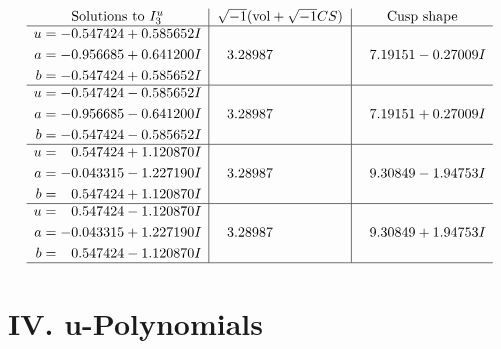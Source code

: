 \documentclass[1p]{elsarticle_modified}
\theoremstyle{definition}
\newcommand{\I}{\sqrt{-1}}
\begin{document}
$$\begin{array}{c|c|c}  
\text{Solutions to }I^u_{3}& \I (\text{vol} + \sqrt{-1}CS) & \text{Cusp shape}\\
 \hline 
\begin{aligned}
u &= -0.547424 + 0.585652 I \\
a &= -0.956685 + 0.641200 I \\
b &= -0.547424 + 0.585652 I\end{aligned}
 & \phantom{-}3.28987\phantom{ +0.000000I} & \phantom{-}7.19151 - 0.27009 I \\ \hline\begin{aligned}
u &= -0.547424 - 0.585652 I \\
a &= -0.956685 - 0.641200 I \\
b &= -0.547424 - 0.585652 I\end{aligned}
 & \phantom{-}3.28987\phantom{ +0.000000I} & \phantom{-}7.19151 + 0.27009 I \\ \hline\begin{aligned}
u &= \phantom{-}0.547424 + 1.120870 I \\
a &= -0.043315 - 1.227190 I \\
b &= \phantom{-}0.547424 + 1.120870 I\end{aligned}
 & \phantom{-}3.28987\phantom{ +0.000000I} & \phantom{-}9.30849 - 1.94753 I \\ \hline\begin{aligned}
u &= \phantom{-}0.547424 - 1.120870 I \\
a &= -0.043315 + 1.227190 I \\
b &= \phantom{-}0.547424 - 1.120870 I\end{aligned}
 & \phantom{-}3.28987\phantom{ +0.000000I} & \phantom{-}9.30849 + 1.94753 I\\
 \hline 
 \end{array}$$\newpage
\newpage\renewcommand{\arraystretch}{1}
\centering \section*{ IV. u-Polynomials}
\end{document}
